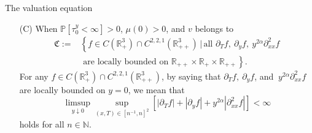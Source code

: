 \documentclass[final]{beamer}
\newlength{\onecolwid}
\theoremstyle{definition}
\theoremstyle{remark}
\newcommand{\Real}{\mathbb R}
\newcommand{\Natural}{\mathbb N}
\newcommand{\such}{\, | \, }
\newcommand{\prob}{\mathbb{P}}
\newcommand{\bra}[1]{\left[#1\right]}
\newcommand{\fC}{\mathfrak{C}}
\begin{document}
\begin{frame}[t]
\begin{columns}[t]
\begin{column}{\onecolwid}
\begin{block}{The valuation equation}
{\begin{enumerate}
            \item[(C)] When $\prob[\tau^y_0<\infty]>0$, $\mu(0)>0$, and $v$ belongs to
            \[
            \begin{split}
                \fC := &\left\{ f \in C(\Real_+^3) \cap C^{2,2,1}(\Real_{++}^3) \such \text{all } \partial_T f, \  \partial_y f, \ y^{2 \alpha}
                \partial^2_{xx} f \right. \\
                & \left. \text{ are locally bounded on } \Real_{++} \times \Real_+ \times \Real_{++}\right\}.
            \end{split}
            \]
            For any $f\in C(\Real_+^3) \cap C^{2,2,1}(\Real_{++}^3)$, by saying that $\partial_T f, \  \partial_y f$, and $\ y^{2 \alpha} \partial^2_{xx} f$ are locally bounded on $y=0$, we mean that
            \[
                \limsup_{y \downarrow 0} \sup_{(x, T) \in [n^{-1}, n]^2} \bra{|\partial_T f| + |\partial_y f| + y^{2 \alpha} |\partial^2_{xx} f| }  < \infty
            \]
            holds for all $n \in \Natural$.
            \end{enumerate}
     }
     \end{block}
    \end{column}


\end{columns}
\end{frame}
\end{document}
